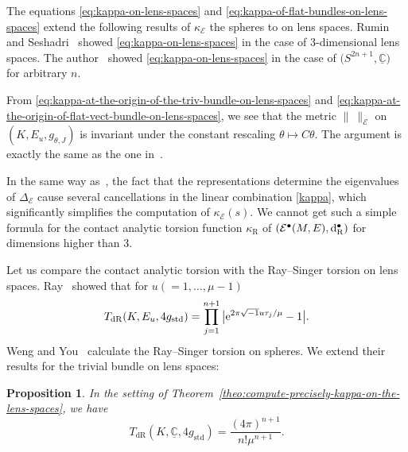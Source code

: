 \documentclass[10pt,a4paper]{amsart}
\numberwithin{equation}{section}
\newtheorem{Proposition}[Theorem]{Proposition}
 { \theoremstyle{definition}
\newtheorem{Definition}[Theorem]{Definition}
\newtheorem{Note}[Theorem]{Note}
\newtheorem{Example}[Theorem]{Example}
\newtheorem{Remark}[Theorem]{Remark} }
\newcommand{\ii}{\sqrt{-1}}
\newcommand{\deRham}{\mathrm{dR}}
\newcommand{\Rumin}{\mathrm{R}}
\newcommand{\RN}{\cE}
\newcommand{\bC}{\mathbb{C}}
\newcommand{\cE}{\mathcal{E}}
\begin{document}
The equations \eqref{eq:kappa-on-lens-spaces} and \eqref{eq:kappa-of-flat-bundles-on-lens-spaces} extend the following results of $\kappa_{\RN}$ the spheres to on lens spaces.
Rumin and Seshadri~\cite[Theorem 5.4]{Rumin-Seshadri-12} showed \eqref{eq:kappa-on-lens-spaces} in the case of 3-dimensional lens spaces.
The author~\cite{Kitaoka-19} showed \eqref{eq:kappa-on-lens-spaces} in the case of $\big(S^{2n+1}, \underline{\bC}\big)$ for arbitrary $n$.

From \eqref{eq:kappa-at-the-origin-of-the-triv-bundle-on-lens-spaces} and \eqref{eq:kappa-at-the-origin-of-flat-vect-bundle-on-lens-spaces},
we see that
the metric $\| \ \|_\RN $ on $( K, E_{u} , g_{\theta , J} )$ is invariant under the constant rescaling $\theta \mapsto C \theta$.
The argument is exactly the same as the one in~\cite{Rumin-Seshadri-12}.

In the same way as~\cite{Kitaoka-19},
the fact that the representations determine the eigenvalues of $\Delta_\RN$ cause several cancellations in the linear combination \eqref{kappa}, which significantly simplifies the computation of $\kappa_\RN (s)$.
We cannot get such a simple formula for the contact analytic torsion function $\kappa_{\Rumin}$ of $(\cE ^\bullet (M,E), {\rm d}_{\Rumin}^\bullet)$
for dimensions higher than $3$.

Let us compare the contact analytic torsion with the Ray--Singer torsion on lens spaces.
Ray~\cite{Ray-70} showed that for $u (= 1 ,\ldots , \mu -1)$
\[
 T_{\deRham} ( K , E_{u}, 4 g_{\mathrm{std}} )
 =
 \prod_{j=1}^{n+1} \big| {\rm e}^{ 2 \pi \ii u {\tau}_j / \mu } -1 \big|
 .
\]
Weng and You~\cite{Weng-You-96} calculate the Ray--Singer torsion on spheres.
We extend their results for the trivial bundle on lens spaces:
\begin{Proposition}
 \label{prop:Ray--Singer_torsion_of_the_trivial_bundle_on_lens_spaces}
 In the setting of Theorem~{\rm \ref{theo:compute-precisely-kappa-on-the-lens-spaces}},
 we have
 \[
 T_{\deRham} ( K, \underline{\bC} , 4 g_{\mathrm{std}})
 = \frac{ (4 \pi)^{n+1}}{ n! \mu^{n+1}} .
 \]
\end{Proposition}
\end{document}
